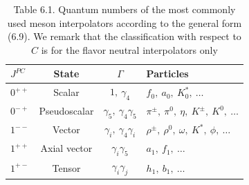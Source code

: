 \begin{table}[htbp]
  \centering
  \caption*{Table 6.1. Quantum numbers of the most commonly used meson
    interpolators according to the general form (6.9). We remark that the
    classification with respect to $C$ is for the flavor neutral interpolators
    only}
  \begin{tabular}{@{}l c c l@{}}
    \toprule
    $J^{PC}$ & State & $\Gamma$ & Particles \\
    \midrule
    $0^{++}$ & Scalar & $1,\ \gamma_4$ & $f_0,\ a_0,\ K_0^*,\ \ldots$ \\
    $0^{-+}$ & Pseudoscalar & $\gamma_5,\ \gamma_4\gamma_5$
      & $\pi^\pm,\ \pi^0,\ \eta,\ K^\pm,\ K^0,\ \ldots$ \\
    $1^{--}$ & Vector & $\gamma_i,\ \gamma_4\gamma_i$
      & $\rho^\pm,\ \rho^0,\ \omega,\ K^*,\ \phi,\ \ldots$ \\
    $1^{++}$ & Axial vector & $\gamma_i\gamma_5$ & $a_1,\ f_1,\ \ldots$ \\
    $1^{+-}$ & Tensor & $\gamma_i\gamma_j$ & $h_1,\ b_1,\ \ldots$ \\
    \bottomrule
  \end{tabular}
\end{table}

